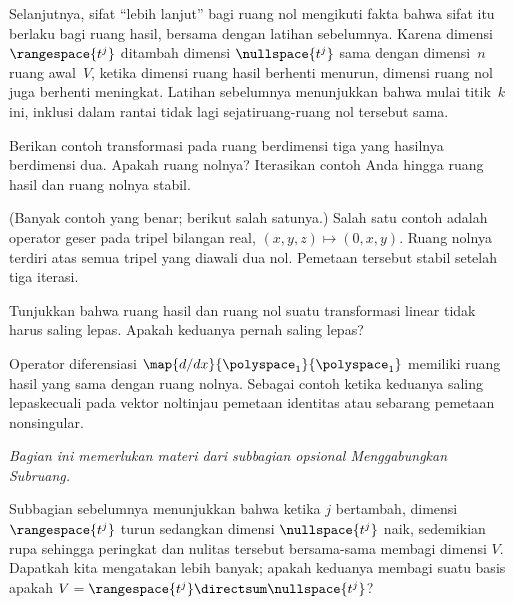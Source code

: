 \begin{exercises}
\begin{answer}
      Selanjutnya, sifat ``lebih lanjut'' bagi ruang nol mengikuti fakta bahwa
      sifat itu berlaku bagi ruang hasil, bersama dengan latihan sebelumnya.
      Karena dimensi $\rangespace{t^j}$ ditambah dimensi
      $\nullspace{t^j}$ sama dengan dimensi~$n$ ruang awal~$V$, ketika dimensi
      ruang hasil berhenti menurun, dimensi ruang nol juga berhenti meningkat.
      Latihan sebelumnya menunjukkan bahwa mulai titik~$k$ ini, inklusi dalam
      rantai tidak lagi sejati\Dash ruang-ruang nol tersebut sama.
    \end{answer}
  \recommended\item
    Berikan contoh transformasi pada ruang berdimensi tiga yang hasilnya
    berdimensi dua.
    Apakah ruang nolnya?
    Iterasikan contoh Anda hingga ruang hasil dan ruang nolnya stabil.
    \begin{answer}
      (Banyak contoh yang benar; berikut salah satunya.)
      Salah satu contoh adalah operator geser pada tripel bilangan real,
      \( (x,y,z)\mapsto (0,x,y) \).
      Ruang nolnya terdiri atas semua tripel yang diawali dua nol.
      Pemetaan tersebut stabil setelah tiga iterasi.
     \end{answer}
  \item 
      Tunjukkan bahwa ruang hasil dan ruang nol suatu transformasi linear tidak
      harus saling lepas.
      Apakah keduanya pernah saling lepas?
      \begin{answer}
        Operator diferensiasi \( \map{d/dx}{\polyspace_1}{\polyspace_1} \)
        memiliki ruang hasil yang sama dengan ruang nolnya.
        Sebagai contoh ketika keduanya saling lepas\Dash kecuali pada vektor
        nol\Dash tinjau pemetaan identitas atau sebarang pemetaan nonsingular.
      \end{answer}
\end{exercises}

















\noindent\textit{Bagian ini memerlukan materi dari subbagian opsional
    Menggabungkan Subruang.}

Subbagian sebelumnya menunjukkan bahwa ketika \( j \) bertambah, dimensi
$\rangespace{t^j}$ turun sedangkan dimensi $\nullspace{t^j}$ naik, sedemikian
rupa sehingga peringkat dan nulitas tersebut bersama-sama membagi dimensi $V$.
Dapatkah kita mengatakan lebih banyak; apakah keduanya membagi suatu basis\Dash
apakah
\( V=\rangespace{t^j}\directsum\nullspace{t^j} \)?


